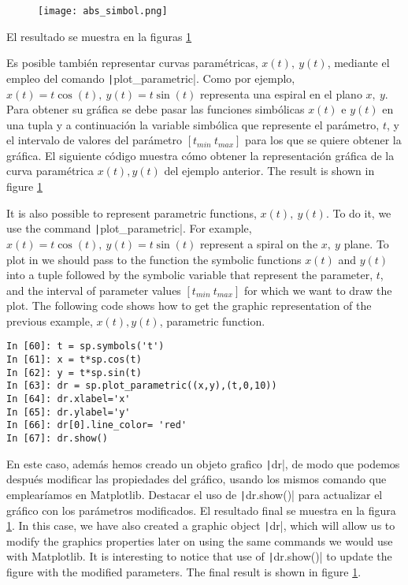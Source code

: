 \begin{figure}
	\centering
		\texttt{[image: abs\_simbol.png]}
		 \label{fig:simplot1}
\end{figure}
\begin{paracol}{2}
El resultado se muestra en la figuras \ref{fig:simplot1}

Es posible también representar curvas paramétricas, $x(t),\ y(t)$, mediante el empleo del comando \texttt|plot_parametric|. Como por ejemplo, $x(t) = t\cos(t),\  y(t)= t\sin(t)$ representa una espiral en el plano $x,\ y$. Para obtener su gráfica se debe pasar  las funciones simbólicas $x(t)$ e $y(t)$ en una tupla y a continuación la variable simbólica que represente el parámetro, $t$, y el intervalo de valores del parámetro $[t_{min} \ t_{max}]$ para los que se quiere obtener la gráfica.  El siguiente código muestra cómo obtener la representación gráfica de la curva paramétrica $x(t),y(t)$ del ejemplo anterior.
\switchcolumn
The result is shown in figure \ref{fig:simplot1}

It is also possible to represent parametric functions, $x(t),\ y(t)$. To do it, we  use the command \texttt|plot_parametric|. For example, $x(t) = t\cos(t),\  y(t)= t\sin(t)$ represent a spiral on the $x,\ y$ plane. To plot in we should pass to the function the symbolic functions $x(t)$ and $y(t)$ into a tuple followed by the symbolic variable that represent the parameter, $t$, and the interval of parameter values $[t_{min} \ t_{max}]$ for which we want to draw the plot. The following code shows how to get the graphic representation of the previous example, $x(t),y(t)$, parametric function. 
\end{paracol}
\begin{center}
	\begin{minipage}{.6\textwidth}
		\begin{verbatim}
In [60]: t = sp.symbols('t')
In [61]: x = t*sp.cos(t)
In [62]: y = t*sp.sin(t)
In [63]: dr = sp.plot_parametric((x,y),(t,0,10))
In [64]: dr.xlabel='x'
In [65]: dr.ylabel='y'
In [66]: dr[0].line_color= 'red'
In [67]: dr.show()
		\end{verbatim}
	\end{minipage}
\end{center}
\begin{paracol}{2}
En este caso, además hemos creado un objeto grafico \texttt|dr|, de modo que podemos después modificar las propiedades del gráfico, usando los mismos comando que emplearíamos en Matplotlib. Destacar el uso de \texttt|dr.show()| para actualizar el gráfico con los parámetros modificados. El resultado final se muestra en la figura \ref{fig:simplot1}.
\switchcolumn
In this case, we have also created a graphic object \texttt|dr|, which will allow us to modify the graphics properties later on using the same commands we would use with Matplotlib. It is interesting to notice that use of \texttt|dr.show()| to update the figure with the modified parameters. The final result is shown in figure \ref{fig:simplot1}.
\end{paracol}
 
